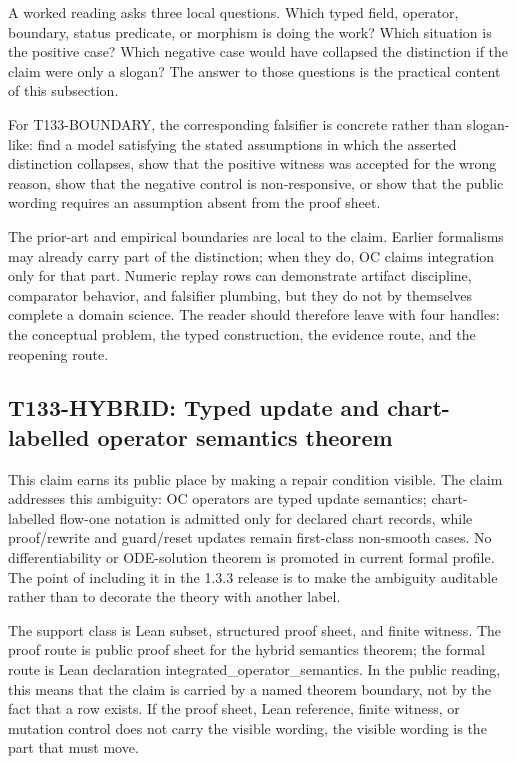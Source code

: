 A worked reading asks three local questions. Which typed field, operator, boundary, status predicate, or morphism is doing the work? Which situation is the positive case? Which negative case would have collapsed the distinction if the claim were only a slogan? The answer to those questions is the practical content of this subsection.

For T133-BOUNDARY, the corresponding falsifier is concrete rather than slogan-like: find a model satisfying the stated assumptions in which the asserted distinction collapses, show that the positive witness was accepted for the wrong reason, show that the negative control is non-responsive, or show that the public wording requires an assumption absent from the proof sheet.

The prior-art and empirical boundaries are local to the claim. Earlier formalisms may already carry part of the distinction; when they do, OC claims integration only for that part. Numeric replay rows can demonstrate artifact discipline, comparator behavior, and falsifier plumbing, but they do not by themselves complete a domain science. The reader should therefore leave with four handles: the conceptual problem, the typed construction, the evidence route, and the reopening route.

\subsection{T133-HYBRID: Typed update and chart-labelled operator semantics theorem}
This claim earns its public place by making a repair condition visible. The claim addresses this ambiguity: OC operators are typed update semantics; chart-labelled flow-one notation is admitted only for declared chart records, while proof/rewrite and guard/reset updates remain first-class non-smooth cases. No differentiability or ODE-solution theorem is promoted in current formal profile. The point of including it in the 1.3.3 release is to make the ambiguity auditable rather than to decorate the theory with another label.

The support class is Lean subset, structured proof sheet, and finite witness. The proof route is public proof sheet for the hybrid semantics theorem; the formal route is Lean declaration integrated\_operator\_semantics. In the public reading, this means that the claim is carried by a named theorem boundary, not by the fact that a row exists. If the proof sheet, Lean reference, finite witness, or mutation control does not carry the visible wording, the visible wording is the part that must move.

